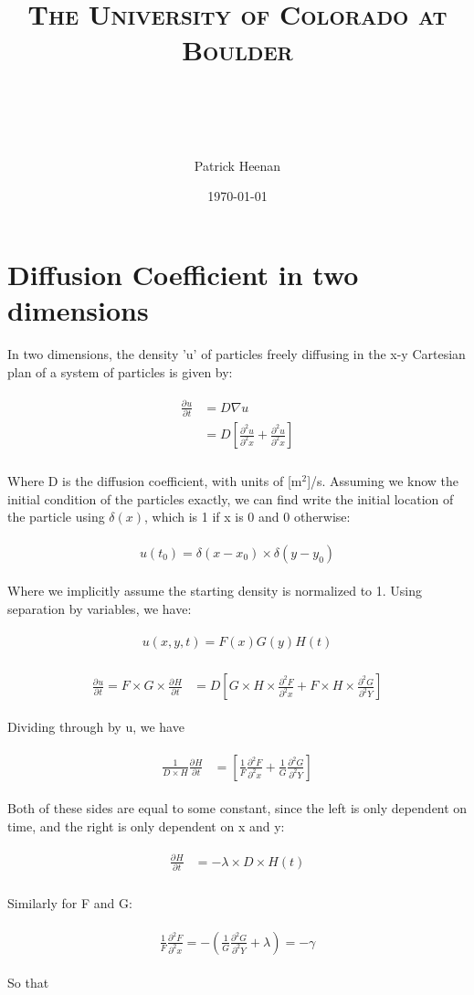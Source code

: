 \documentclass[paper=a4, fontsize=11pt]{scrartcl} %
\title{	
\normalfont \normalsize 
\textsc{The University of Colorado at Boulder} \\ [25pt] %
\horrule{0.5pt} \\[0.4cm] %
\horrule{2pt} \\[0.5cm] %
}
\author{Patrick Heenan} %
\date{\normalsize\today} %
\numberwithin{equation}{section} %
\numberwithin{figure}{section} %
\numberwithin{table}{section} %
\newcommand{\ndiffn}[3]{\frac{\partial^{#3}#1}{\partial^{#3}#2}}
\newcommand{\diffn}[2]{\ndiffn{#1}{#2}{}}
\newcommand{\eqs}[1]{
\begin{align} 
\begin{split}
#1
\end{split}					
\end{align}}
\begin{document}
\maketitle %


\section{Diffusion Coefficient in two dimensions}

In two dimensions, the density 'u' of particles freely diffusing in the x-y Cartesian plan of a system of particles is given by:

\eqs{
\diffn{u}{t} &=  D \nabla u\\ 
&= D [\ndiffn{u}{x}{2} + \ndiffn{u}{x}{2}] \\
}

Where D is the diffusion coefficient, with units of [m$^2$]/s. Assuming we know the initial condition of the particles exactly, we can find write the initial location of the particle using $\delta(x)$, which is 1 if x is 0 and 0 otherwise:

\eqs{ u(t_0) = \delta(x-x_0) \times \delta(y-y_0) }

Where we implicitly assume the starting density is normalized to 1. Using separation by variables, we have:

\eqs{ u(x,y,t) = F(x)G(y)H(t)}

\eqs{
\diffn{u}{t} = F\times G \times \diffn{H}{t}
&= D [G \times H \times \ndiffn{F}{x}{2} + F \times H \times \ndiffn{G}{Y}{2}] }

Dividing through by u, we have

\eqs{ \frac{1}{D \times H} \diffn{H}{t}
&= [ \frac{1}{F} \ndiffn{F}{x}{2} + \frac{1}{G} \ndiffn{G}{Y}{2}] }

Both of these sides are equal to some constant, since the left is only dependent on time, and the right is only dependent on x and y:


\eqs{
 \diffn{H}{t} &= -\lambda \times D \times H(t) \\ }

Similarly for F and G: 

\eqs{ \frac{1}{F} \ndiffn{F}{x}{2}  = -(\frac{1}{G} \ndiffn{G}{Y}{2} + \lambda)
  =-\gamma }


So that 
\end{document}
